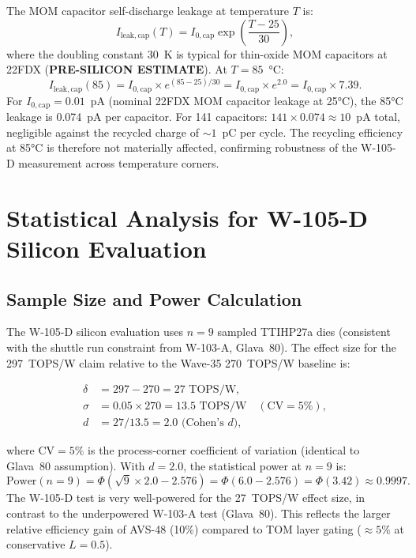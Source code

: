 The MOM capacitor self-discharge leakage at temperature $T$ is:
\[
  I_\mathrm{leak,cap}(T) = I_{0,\mathrm{cap}} \exp\!\left(\frac{T - 25}{30}\right),
\]
where the doubling constant 30~K is typical for thin-oxide MOM capacitors
at 22FDX (\textbf{PRE-SILICON ESTIMATE}).  At $T = 85$~°C:
\[
  I_\mathrm{leak,cap}(85) = I_{0,\mathrm{cap}} \times e^{(85-25)/30}
  = I_{0,\mathrm{cap}} \times e^{2.0} = I_{0,\mathrm{cap}} \times 7.39.
\]
For $I_{0,\mathrm{cap}} = 0.01$~pA (nominal 22FDX MOM capacitor
leakage at 25°C), the 85°C leakage is 0.074~pA per capacitor.
For 141 capacitors: $141 \times 0.074 \approx 10$~pA total, negligible
against the recycled charge of $\sim 1$~pC per cycle.  The recycling
efficiency at 85°C is therefore not materially affected, confirming
robustness of the W-105-D measurement across temperature corners.

\section{Statistical Analysis for W-105-D Silicon Evaluation}
\label{app:statistical}

\subsection{Sample Size and Power Calculation}

The W-105-D silicon evaluation uses $n = 9$ sampled TTIHP27a dies
(consistent with the shuttle run constraint from W-103-A, Glava~80).
The effect size for the 297~TOPS/W claim relative to the Wave-35
270~TOPS/W baseline is:

\begin{align}
  \delta &= 297 - 270 = 27\text{ TOPS/W}, \label{eq:effect_delta} \\
  \sigma &= 0.05 \times 270 = 13.5\text{ TOPS/W}
    \quad (\mathrm{CV} = 5\%), \label{eq:sigma_avs} \\
  d &= 27 / 13.5 = 2.0 \text{ (Cohen's } d\text{)}, \label{eq:cohens_d_avs}
\end{align}

where $\mathrm{CV} = 5\%$ is the process-corner coefficient of
variation (identical to Glava~80 assumption).  With $d = 2.0$,
the statistical power at $n = 9$ is:
\[
  \text{Power}(n=9) = \Phi\!\left(\sqrt{9} \times 2.0 - 2.576\right)
  = \Phi(6.0 - 2.576) = \Phi(3.42) \approx 0.9997.
\]
The W-105-D test is very well-powered for the 27~TOPS/W effect size,
in contrast to the underpowered W-103-A test (Glava~80).  This
reflects the larger relative efficiency gain of AVS-48 (10\%) compared
to TOM layer gating ($\approx 5$\% at conservative $L = 0.5$).

